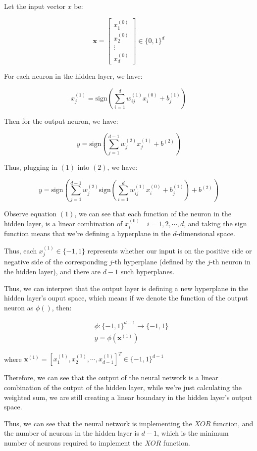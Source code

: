 \documentclass{article}
\begin{document}
Let the input vector $x$ be:

\begin{equation*}
    \mathbf{x} = 
    \begin{bmatrix}
        x_1^{(0)} \\
        x_2^{(0)} \\
        \vdots \\
        x_d^{(0)}
    \end{bmatrix}
    \in \{0, 1\}^d
\end{equation*}

For each neuron in the hidden layer, we have:

\begin{equation}
    x_j^{(1)} = \mathrm{sign}\left(\sum_{i=1}^d w_{ij}^{(1)} x_i^{(0)} + b_j^{(1)}\right)
\end{equation}

Then for the output neuron, we have:

\begin{equation}
    y = \mathrm{sign}\left(\sum_{j=1}^{d-1} w_j^{(2)} x_j^{(1)} + b^{(2)}\right)
\end{equation}

Thus, plugging in $(1)$ into $(2)$, we have:

\begin{equation*}
    y = \mathrm{sign}\left(\sum_{j=1}^{d-1} w_j^{(2)} \mathrm{sign}\left(\sum_{i=1}^d w_{ij}^{(1)} x_i^{(0)} + b_j^{(1)}\right) + b^{(2)}\right)
    \tag{*}
\end{equation*}

Observe equation $(1)$, we can see that each function of the neuron in the hidden layer,
is a linear combination of $x_i^{(0)} \quad i = 1, 2, \cdots, d$, and taking the sign function means that
we're defining a hyperplane in the $d$-dimensional space.
\bigskip

Thus, each $x_j^{(1)} \in \{-1, 1\}$ represents whether our input is on the positive side or negative side 
of the corresponding $j$-th hyperplane (defined by the $j$-th neuron in the hidden layer),
and there are $d-1$ such hyperplanes.
\bigskip

Thus, we can interpret that the output layer is defining a new hyperplane in the hidden layer's ouput space, 
which means if we denote the function of the output neuron as $\phi()$, then:

\begin{align*}
    &\phi: \{-1, 1\}^{d-1} \to \{-1, 1\} \\
    &y = \phi(\mathbf{x}^{(1)}) \quad 
\end{align*}

where $\mathbf{x}^{(1)} = [x_1^{(1)}, x_2^{(1)}, \cdots, x_{d-1}^{(1)}]^T \in \{-1, 1\}^{d-1}$
\bigskip

Therefore, we can see that the output of the neural network is a linear combination of the output of the hidden layer,
while we're just calculating the weighted sum, 
we are still creating a linear boundary in the hidden layer's output space.
\bigskip

Thus, we can see that the neural network is implementing the $XOR$ function,
and the number of neurons in the hidden layer is $d-1$, which is the minimum number of neurons required to implement the $XOR$ function.
\end{document}
